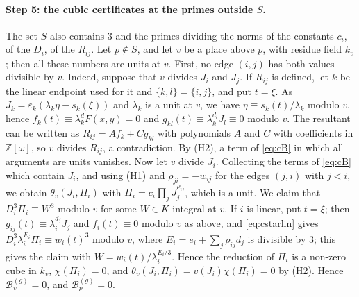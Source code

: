 \documentclass[11pt]{article}
\newcommand{\Z}{\mathbb{Z}}
\begin{document}
\paragraph{Step 5: the cubic certificates at the primes outside $S$.} The set $S$ also contains $3$ and the primes dividing the norms of the constants $c_i$, of the $D_i$, of the $R_{ij}$. Let $p\notin S$, and let $v$ be a place above $p$, with residue field $k_v$; then all these numbers are units at $v$. First, no edge $(i,j)$ has both values divisible by $v$. Indeed, suppose that $v$ divides $J_i$ and $J_j$. If $R_{ij}$ is defined, let $k$ be the linear endpoint used for it and $\{k,l\}=\{i,j\}$, and put $t=\xi$. As $J_k=\varepsilon_k(\lambda_k\eta-s_k(\xi))$ and $\lambda_k$ is a unit at $v$, we have $\eta\equiv s_k(t)/\lambda_k$ modulo $v$, hence $f_k(t)\equiv\lambda_k^dF(x,y)=0$ and $g_{kl}(t)\equiv\lambda_k^{d_l}J_l\equiv0$ modulo $v$. The resultant can be written as $R_{ij}=Af_k+Cg_{kl}$ with polynomials $A$ and $C$ with coefficients in $\Z[\omega]$, so $v$ divides $R_{ij}$, a contradiction. By (H2), a term of \eqref{eq:cB} in which all arguments are units vanishes. Now let $v$ divide $J_i$. Collecting the terms of \eqref{eq:cB} which contain $J_i$, and using (H1) and $\rho_{ji}=-w_{ij}$ for the edges $(j,i)$ with $j<i$, we obtain $\theta_v(J_i,\Pi_i)$ with $\Pi_i=c_i\prod_jJ_j^{\rho_{ij}}$, which is a unit. We claim that $D_i^3\Pi_i\equiv W^3$ modulo $v$ for some $W\in K$ integral at $v$. If $i$ is linear, put $t=\xi$; then $g_{ij}(t)\equiv\lambda_i^{d_j}J_j$ and $f_i(t)\equiv0$ modulo $v$ as above, and \eqref{eq:cstarlin} gives $D_i^3\lambda_i^{E_i}\Pi_i\equiv w_i(t)^3$ modulo $v$, where $E_i=e_i+\sum_j\rho_{ij}d_j$ is divisible by $3$; this gives the claim with $W=w_i(t)/\lambda_i^{E_i/3}$. Hence the reduction of $\Pi_i$ is a non-zero cube in $k_v$, $\chi(\Pi_i)=0$, and $\theta_v(J_i,\Pi_i)=v(J_i)\chi(\Pi_i)=0$ by (H2). Hence $\mathcal B^{(g)}_v=0$, and $\mathcal B^{(g)}_p=0$.
\end{document}
